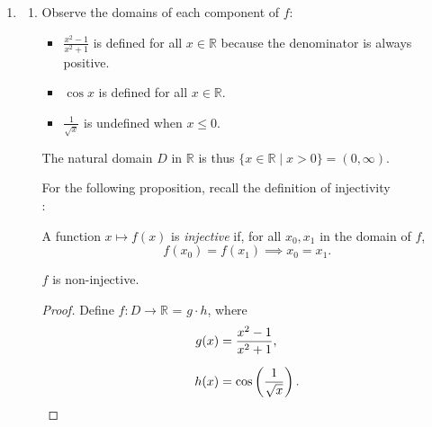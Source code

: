 \begin{enumerate}
\begin{enumerate}
\begin{proof}
                    But the minimum positive value of $c$ is $\sqrt{5 - 2 \sqrt{5}}$.
                    Therefore, due to the corollary of \cref{prop:2},
                    \[
                        \tan \left(\frac{\pi}{5}\right) = \sqrt{5 - 2\sqrt{5}}. \qedhere
                    \]
                \end{proof}

        \end{enumerate}

        \bigskip

    \item
        \begin{enumerate}

            \item Observe the domains of each component of $f$:
                \begin{itemize}
                    \item $\frac{x^2 - 1}{x^2 + 1}$ is defined for all $x \in \mathbb{R}$ because the denominator is always positive.

                    \item $\cos x$ is defined for all $x \in \mathbb{R}$.

                    \item $\frac{1}{\sqrt{x}}$ is undefined when $x \le 0$.
                \end{itemize}
                The natural domain $D$ in $\mathbb{R}$ is thus $\{x \in \mathbb{R} \; | \; x > 0\} = (0, \infty)$.

                \medskip

                For the following proposition, recall the definition of injectivity \\ \parencite{injective-function}:
                \begin{definition} \label{def:injective}
                    A function $x \mapsto f(x)$ is \emph{injective} if, for all $x_0, x_1$ in the domain of $f$,
                    \[ f(x_0) = f(x_1) \implies x_0 = x_1. \]
                \end{definition}

                \begin{proposition} \label{prop:4}
                    $f$ is non-injective.
                \end{proposition}

                \begin{proof}
                    Define $f: D \rightarrow \mathbb{R}$ = $g \cdot h$, where
                    \begin{align*}
                        g(x) &= \frac{x^2 - 1}{x^2 + 1}, \\[2\jot]
                        h(x) &= \cos\left(\frac{1}{\sqrt{x}}\right).
                    \end{align*}


\end{proof}
\end{enumerate}
\end{enumerate}
